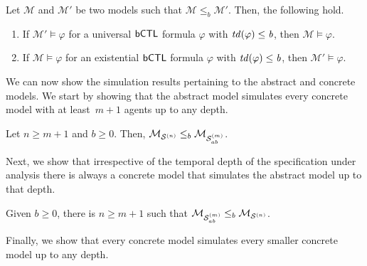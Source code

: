 \begin{theorem} Let $\mathcal M$ and $\mathcal M'$ be two models such that $\mathcal
M \leq_b  \mathcal M'$. Then, the following hold.
\label{th:sim}
\begin{enumerate}
    \item If $\mathcal M' \models \varphi$ for a universal $\sf{bCTL}$ formula
    $\varphi$ with $\it{td}(\varphi) \leq b$, then $\mathcal M \models
    \varphi$.
    \item If $\mathcal M \models \varphi$ for an existential $\sf{bCTL}$ formula
    $\varphi$ with $\it{td}(\varphi) \leq b$, then $\mathcal M' \models
    \varphi$.
\end{enumerate}
\end{theorem}

We can now show the simulation results pertaining to the
abstract and concrete models. We start by showing that the
abstract model simulates every concrete model with at
least~$m+1$ agents up to any depth.

\begin{theorem}
\label{th:ab-concr-sim}
Let $n \geq m+1$ and $b \geq 0$. Then, $\mathcal{M}_{\mathcal{S}^{(n)}} \leq_b
    \mathcal{M}_{\mathcal{S}_{ab}^{(m)}}$.
\end{theorem}

Next, we show that irrespective of the temporal depth of the
specification under analysis there is always a concrete
model that simulates the abstract model up to that depth.

\begin{theorem}
\label{th:concr-ab-sim}
Given $b \geq 0$, there is $n \geq m+1$ such that $\mathcal{M}_{\mathcal{S}_{ab}^{(m)}}
    \leq_b \mathcal{M}_{\mathcal{S}^{(n)}}$.
\end{theorem}


Finally, we show that every concrete model simulates every
smaller concrete model up to any depth.

